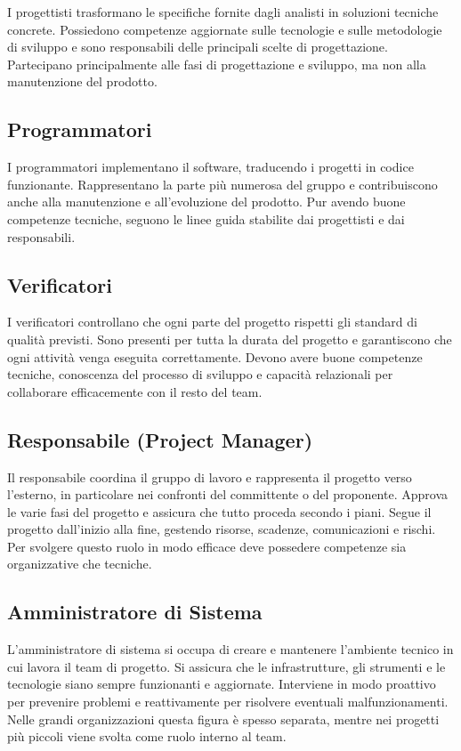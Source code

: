 \documentclass[a4paper, 11pt, oneside]{scrartcl} %
\begin{document}
I progettisti trasformano le specifiche fornite dagli analisti in soluzioni tecniche concrete.  
Possiedono competenze aggiornate sulle tecnologie e sulle metodologie di sviluppo e sono responsabili delle principali scelte di progettazione.  
Partecipano principalmente alle fasi di progettazione e sviluppo, ma non alla manutenzione del prodotto.

\subsection{Programmatori}

I programmatori implementano il software, traducendo i progetti in codice funzionante.  
Rappresentano la parte più numerosa del gruppo e contribuiscono anche alla manutenzione e all’evoluzione del prodotto.  
Pur avendo buone competenze tecniche, seguono le linee guida stabilite dai progettisti e dai responsabili.

\subsection{Verificatori}

I verificatori controllano che ogni parte del progetto rispetti gli standard di qualità previsti.  
Sono presenti per tutta la durata del progetto e garantiscono che ogni attività venga eseguita correttamente.  
Devono avere buone competenze tecniche, conoscenza del processo di sviluppo e capacità relazionali per collaborare efficacemente con il resto del team.

\subsection{Responsabile (Project Manager)}

Il responsabile coordina il gruppo di lavoro e rappresenta il progetto verso l’esterno, in particolare nei confronti del committente o del proponente.  
Approva le varie fasi del progetto e assicura che tutto proceda secondo i piani.  
Segue il progetto dall’inizio alla fine, gestendo risorse, scadenze, comunicazioni e rischi.  
Per svolgere questo ruolo in modo efficace deve possedere competenze sia organizzative che tecniche.

\subsection{Amministratore di Sistema}

L’amministratore di sistema si occupa di creare e mantenere l’ambiente tecnico in cui lavora il team di progetto.  
Si assicura che le infrastrutture, gli strumenti e le tecnologie siano sempre funzionanti e aggiornate.  
Interviene in modo proattivo per prevenire problemi e reattivamente per risolvere eventuali malfunzionamenti.  
Nelle grandi organizzazioni questa figura è spesso separata, mentre nei progetti più piccoli viene svolta come ruolo interno al team.
\end{document}
